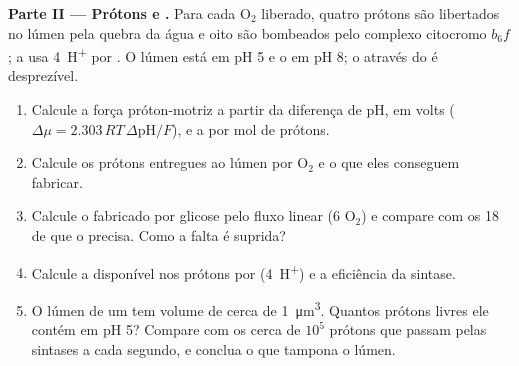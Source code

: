 \begin{problem}
\medskip
\noindent\textbf{Parte II --- Prótons e .}
Para cada $\mathrm{O_2}$ liberado, quatro prótons são libertados no
lúmen pela quebra da água e oito são bombeados pelo complexo citocromo
$b_6f$; a  usa \qty{4}{H^+} por . O lúmen está em pH 5 e o
 em pH 8; o  através do  é
desprezível.
\begin{enumerate}[resume]
  \item Calcule a força próton-motriz a partir da diferença de pH, em
        volts ($\Delta\mu = 2.303\,RT\,\Delta\mathrm{pH}/F$), e a  por mol de prótons.
  \item Calcule os prótons entregues ao lúmen por $\mathrm{O_2}$ e o 
        que eles conseguem fabricar.
  \item Calcule o  fabricado por glicose pelo fluxo linear (6
        $\mathrm{O_2}$) e compare com os 18 de que o 
        precisa. Como a falta é suprida?
  \item Calcule a  disponível nos prótons por 
        (\qty{4}{H^+}) e a eficiência da sintase.
  \item O lúmen de um  tem volume de cerca de
        \qty{1}{\micro m^3}. Quantos prótons livres ele contém em pH 5?
        Compare com os cerca de $10^5$ prótons que passam pelas sintases
        a cada segundo, e conclua o que tampona o lúmen.
\end{enumerate}


\end{problem}
